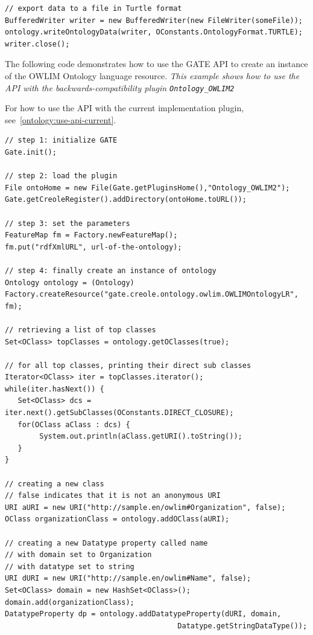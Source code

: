 {\begin{lstlisting}
// export data to a file in Turtle format
BufferedWriter writer = new BufferedWriter(new FileWriter(someFile));
ontology.writeOntologyData(writer, OConstants.OntologyFormat.TURTLE);
writer.close();
\end{lstlisting}


The following code demonstrates how to use the GATE API to create an instance of
the OWLIM Ontology language resource. \emph{This example shows how to use the 
API with the backwards-compatibility plugin \texttt{Ontology\_OWLIM2}}

For how to use the API with the current implementation plugin, 
see~\ref{ontology:use-api-current}.

\begin{lstlisting}
// step 1: initialize GATE
Gate.init();

// step 2: load the plugin
File ontoHome = new File(Gate.getPluginsHome(),"Ontology_OWLIM2");
Gate.getCreoleRegister().addDirectory(ontoHome.toURL());

// step 3: set the parameters
FeatureMap fm = Factory.newFeatureMap();
fm.put("rdfXmlURL", url-of-the-ontology);

// step 4: finally create an instance of ontology
Ontology ontology = (Ontology) 
Factory.createResource("gate.creole.ontology.owlim.OWLIMOntologyLR", fm);

// retrieving a list of top classes
Set<OClass> topClasses = ontology.getOClasses(true);

// for all top classes, printing their direct sub classes
Iterator<OClass> iter = topClasses.iterator();
while(iter.hasNext()) {
   Set<OClass> dcs = iter.next().getSubClasses(OConstants.DIRECT_CLOSURE);
   for(OClass aClass : dcs) {
        System.out.println(aClass.getURI().toString());
   }
}

// creating a new class
// false indicates that it is not an anonymous URI
URI aURI = new URI("http://sample.en/owlim#Organization", false);
OClass organizationClass = ontology.addOClass(aURI);

// creating a new Datatype property called name
// with domain set to Organization
// with datatype set to string
URI dURI = new URI("http://sample.en/owlim#Name", false);
Set<OClass> domain = new HashSet<OClass>();
domain.add(organizationClass);
DatatypeProperty dp = ontology.addDatatypeProperty(dURI, domain, 
                                        Datatype.getStringDataType());


\end{lstlisting}}
